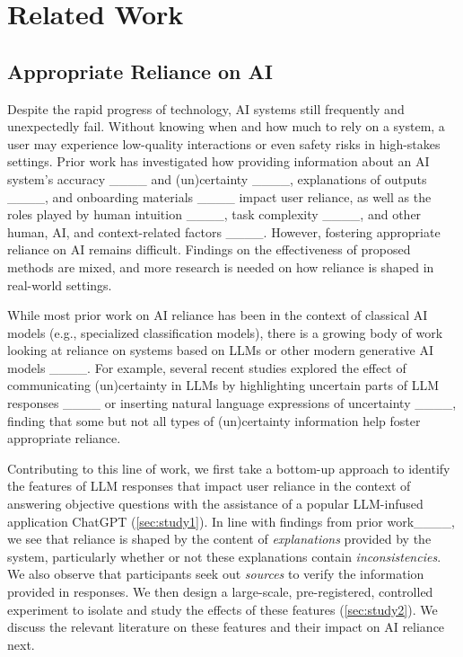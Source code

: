 \section{Related Work}
\subsection{Appropriate Reliance on AI}

Despite the rapid progress of technology, AI systems still frequently and unexpectedly fail. Without knowing when and how much to rely on a system, a user may experience low-quality interactions or even safety risks in high-stakes settings. 
Prior work has investigated how providing information about an AI system's accuracy ____ and (un)certainty ____, explanations of outputs ____, and onboarding materials ____ impact user reliance, as well as the roles played by human intuition ____, task complexity ____, and other human, AI, and context-related factors ____.
However, fostering appropriate reliance on AI remains difficult.
Findings on the effectiveness of proposed methods are mixed, and more research is needed on how reliance is shaped in real-world settings.

While most prior work on AI reliance has been in the context of classical AI models (e.g., specialized classification models), there is a growing body of work looking at reliance on systems based on LLMs or other modern generative AI models ____. 
For example, several recent studies explored the effect of communicating (un)certainty in LLMs by highlighting uncertain parts of LLM responses ____ or inserting natural language expressions of uncertainty ____, finding that some but not all types of (un)certainty information help foster appropriate reliance.

Contributing to this line of work, we first take a bottom-up approach to identify the features of LLM responses that impact user reliance in the context of answering objective questions with the assistance of a popular LLM-infused application ChatGPT (\cref{sec:study1}).
In line with findings from prior work____, we see that reliance is shaped by the content of \textit{explanations} provided by the system, particularly whether or not these explanations contain \textit{inconsistencies}. We also observe that participants seek out \textit{sources} to verify the information provided in responses. We then design a large-scale, pre-registered, controlled experiment to isolate and study the effects of these features (\cref{sec:study2}). We discuss the relevant literature on these features and their impact on AI reliance next.


